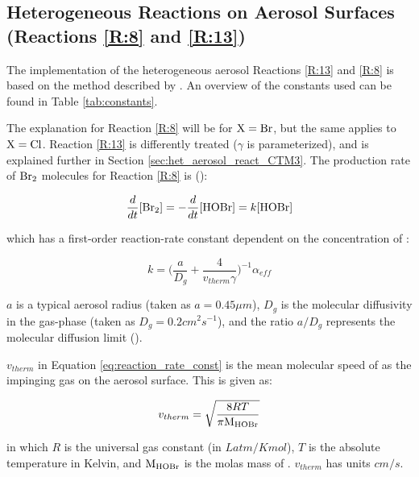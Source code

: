 \subsection{Heterogeneous Reactions on Aerosol Surfaces (Reactions \ref{R:8} and \ref{R:13})}\label{sec:aerosol_react}

The implementation of the heterogeneous aerosol Reactions \ref{R:13} and \ref{R:8} is based on the method described by \cite{CAO}. An overview of the constants used can be found in Table \ref{tab:constants}.

\medskip

The explanation for Reaction \ref{R:8} will be for $\mathrm{X} = \mathrm{Br}$, but the same applies to $\mathrm{X} = \mathrm{Cl}$. Reaction \ref{R:13} is differently treated ($\gamma$ is parameterized), and is explained further in Section \ref{sec:het_aerosol_react_CTM3}. The production rate of $\mathrm{Br_2}$ molecules for Reaction \ref{R:8} is (\cite{schwartz1986}): 

\begin{equation*}
    \frac{d}{dt}[\mathrm{Br_2}] = -\frac{d}{dt}[\mathrm{HOBr}] = k[\mathrm{HOBr}]
\end{equation*}

which has a first-order reaction-rate constant dependent on the concentration of : 

\begin{equation}
    k = \big(\frac{a}{D_g} + \frac{4}{v_{therm}\gamma}\big)^{-1}\alpha_{eff}
    \label{eq:reaction_rate_const}
\end{equation}

$a$ is a typical aerosol radius (taken as $a = 0.45 \mu m$), $D_g$ is the molecular diffusivity in the gas-phase (taken as $D_g = 0.2  cm^2s^{-1}$), and the ratio $a/D_g$ represents the molecular diffusion limit (\cite{CAO}). 

\medskip

$v_{therm}$ in Equation \ref{eq:reaction_rate_const} is the mean molecular speed of  as the impinging gas on the aerosol surface. This is given as:

\begin{equation*}
    v_{therm} = \sqrt{\frac{8RT}{\pi \mathrm{M_{HOBr}}}}
\end{equation*}

in which $R$ is the universal gas constant (in $Latm/Kmol$), $T$ is the absolute temperature in Kelvin,  and $\mathrm{M_{HOBr}}$ is the molas mass of . $v_{therm}$ has units $cm/s$. 

